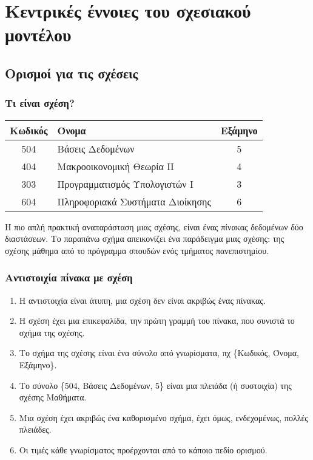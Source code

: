 \el
\section[\textgreek{Περιγραφή}] {\textgreek {Κεντρικές έννοιες του σχεσιακού μοντέλου} }

\subsection[\textgreek{Περί}]{\textgreek{Ορισμοί για τις σχέσεις}}

\begin{frame}
\frametitle{Τι είναι σχέση?}
\begin{minipage}{\wE}
  \begin{tabular}{ c l c } \toprule
    {\bf Κωδικός} & {\bf Όνομα} & {\bf Εξάμηνο} \\ \midrule 
    504 & Βάσεις Δεδομένων & 5 \\ 
    404 & Μακροοικονομική Θεωρία ΙΙ & 4 \\  
    303 & Προγραμματισμός Υπολογιστών Ι & 3 \\   
    604 & Πληροφοριακά Συστήματα Διοίκησης & 6 \\  \bottomrule
  \end{tabular}
  \bigskip \par Η πιο απλή πρακτική αναπαράσταση μιας σχέσης, είναι ένας πίνακας
  δεδομένων δύο διαστάσεων.
  Το παραπάνω σχήμα  απεικονίζει ένα παράδειγμα μιας σχέσης: της σχέσης {\bb μάθημα} από
  το πρόγραμμα σπουδών ενός τμήματος πανεπιστημίου. 
\end{minipage}
\end{frame}


\begin{frame}
\frametitle{Αντιστοιχία πίνακα με σχέση}
\begin{minipage}{\wE}
  \pause
  \begin{enumerate}[<+->] \itemsep 6pt
    \item Η αντιστοιχία είναι άτυπη, μια σχέση δεν είναι ακριβώς ένας πίνακας.
    \item Η σχέση έχει μια {\crr επικεφαλίδα}, την πρώτη
          γραμμή του πίνακα, που συνιστά το {\crr σχήμα της σχέσης}.
    \item Το σχήμα της σχέσης είναι ένα
          σύνολο από γνωρίσματα, πχ  \{Κωδικός, Όνομα, Εξάμηνο\}.
    \item Το σύνολο \{504, Βάσεις Δεδομένων, 5\} 
          είναι μια πλειάδα (ή συστοιχία) της σχέσης {\crr Μαθήματα}.
    \item Μια σχέση έχει ακριβώς ένα καθορισμένο σχήμα, 
          έχει όμως, ενδεχομένως, πολλές πλειάδες.
    \item Οι τιμές κάθε γνωρίσματος προέρχονται από το κάποιο {\crr πεδίο ορισμού}.
\end{enumerate}
\end{minipage}
\end{frame}


